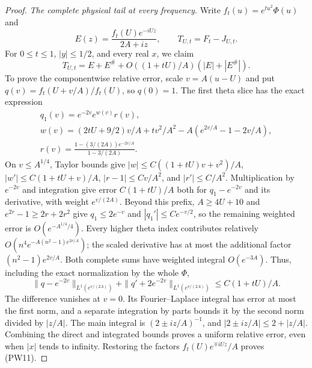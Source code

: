 \documentclass[11pt]{article}
\theoremstyle{remark}\newtheorem{remark}[theorem]{Remark}
\begin{document}
\begin{proof}
\emph{The complete physical tail at every frequency.}
Write $f_t(u)=e^{tu^2}\Phi(u)$ and
\[
 E(z)=\frac{f_t(U)e^{-iUz}}{2A+iz},\qquad
 T_{U,t}=F_t-J_{U,t}.
\]
For $0\le t\le1$, $|y|\le1/2$, and every real $x$, we claim
\[
 T_{U,t}=E+E^\#
       +O((1+tU)/A)(|E|+|E^\#|).                  \tag{PW11}
\]
To prove the componentwise relative error, scale $v=A(u-U)$ and put
$q(v)=f_t(U+v/A)/f_t(U)$, so $q(0)=1$. The first theta slice has
the exact expression
\[
 \begin{gathered}
 q_1(v)=e^{-2v}e^{w(v)}r(v),\\
 w(v)=(2tU+9/2)v/A+tv^2/A^2
                 -A(e^{2v/A}-1-2v/A),\\
 r(v)=\frac{1-(3/(2A))e^{-2v/A}}{1-3/(2A)}.
 \end{gathered}                                      \tag{PW12}
\]
On $v\le A^{1/4}$, Taylor bounds give
$|w|\le C((1+tU)v+v^2)/A$,
$|w'|\le C(1+tU+v)/A$,
$|r-1|\le Cv/A^2$, and $|r'|\le C/A^2$.
Multiplication by $e^{-2v}$ and integration give error
$C(1+tU)/A$ both for $q_1-e^{-2v}$ and its derivative, with
weight $e^{v/(2A)}$. Beyond this prefix,
$A\ge4U+10$ and $e^{2r}-1\ge2r+2r^2$ give
$q_1\le2e^{-v}$ and $|q_1'|\le Ce^{-v/2}$, so the remaining
weighted error is $O(e^{-A^{1/4}/4})$.
Every higher theta index contributes relatively
$O(n^4e^{-A(n^2-1)e^{2v/A}})$; the scaled derivative has at most
the additional factor $(n^2-1)e^{2v/A}$. Both complete sums have
weighted integral $O(e^{-3A})$. Thus, including the exact
normalization by the whole $\Phi$,
\[
 \|q-e^{-2v}\|_{L^1(e^{v/(2A)})}
  +\|q'+2e^{-2v}\|_{L^1(e^{v/(2A)})}
                   \le C(1+tU)/A.                 \tag{PW13}
\]
The difference vanishes at $v=0$. Its Fourier--Laplace integral
has error at most the first norm, and a separate integration by
parts bounds it by the second norm divided by $|z/A|$.
The main integral is $(2\pm iz/A)^{-1}$, and
$|2\pm iz/A|\le2+|z/A|$. Combining the direct and integrated
bounds proves a uniform relative error, even when $|x|$ tends to
infinity. Restoring the factors $f_t(U)e^{\mp iUz}/A$ proves (PW11).


\end{proof}
\end{document}
